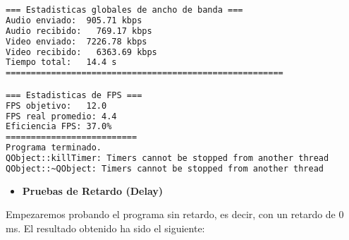 \begin{adjustbox}{max width=\textwidth}
\begin{lstlisting}[language=bash,basicstyle=\ttfamily\scriptsize]
=== Estadisticas globales de ancho de banda ===
Audio enviado:	905.71 kbps
Audio recibido:   769.17 kbps
Video enviado:	7226.78 kbps
Video recibido:   6363.69 kbps
Tiempo total: 	14.4 s
=======================================================

=== Estadisticas de FPS ===
FPS objetivo: 	12.0
FPS real promedio: 4.4
Eficiencia FPS:	37.0%
==========================
Programa terminado.
QObject::killTimer: Timers cannot be stopped from another thread
QObject::~QObject: Timers cannot be stopped from another thread
\end{lstlisting}
\end{adjustbox}
\vspace{\baselineskip}

\newpage

\begin{itemize}
    \item \textbf{Pruebas de Retardo (Delay)}
\end{itemize}

Empezaremos probando el programa sin retardo, es decir, con un retardo de 0 ms. El resultado obtenido ha sido el siguiente:
\vspace{\baselineskip}


